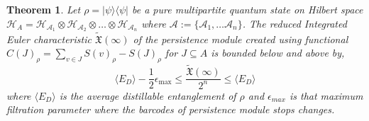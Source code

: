 \documentclass{article}
\newtheorem{theorem}{Theorem}
\newcommand{\ketbra}[2]{| #1\rangle\! \langle #2|}
\begin{document}
\begin{theorem}
\label{theroem:euler_characteristic_distillation}
Let $\rho = \ketbra{\psi}{\psi}$ be a pure multipartite quantum state on Hilbert space $\mathcal{H}_A = \mathcal{H}_{\mathcal{A}_1} \otimes \mathcal{H}_{\mathcal{A}_2} \otimes \dots \otimes \mathcal{H}_{\mathcal{A}_n}$  where $\mathcal{A} := \{\mathcal{A}_1, \dots \mathcal{A}_n\}$. The reduced Integrated Euler characteristic $\tilde{\mathfrak{X}}(\infty)$ of the persistence module created using functional $C(J)_\rho = \sum_{v \in J} S(v)_\rho - S(J)_\rho$ for $J \subseteq A$ is bounded below and above by,
\begin{equation}
\langle E_D \rangle - \frac{1}{2} \epsilon_{\text{max}}  \leq \frac{\tilde{\mathfrak{X}}(\infty)}{2^n} \leq \langle E_D \rangle
\end{equation}
where $\langle E_D \rangle$ is the average distillable entanglement of $\rho$ and $\epsilon_{max}$ is that maximum filtration parameter where the barcodes of persistence module stops changes.
\end{theorem}
\end{document}
